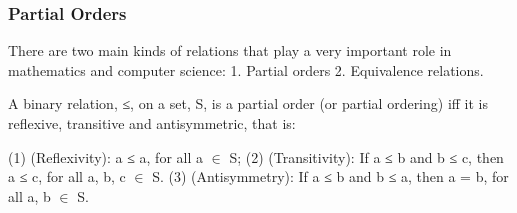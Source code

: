 
\begin{frame}
\frametitle{Partial Orders}
There are two main kinds of relations that play a very
important role in mathematics and computer science:
1. Partial orders
2. Equivalence relations.

\end{frame}
\begin{frame}
A binary relation, ≤, on a set, S, is
a partial order (or partial ordering) iﬀ it is reﬂexive,
transitive and antisymmetric, that is:

(1) (Reﬂexivity): a ≤ a, for all a $\in$ S;
(2) (Transitivity): If a ≤ b and b ≤ c, then a ≤ c, for
all a, b, c $\in$ S.
(3) (Antisymmetry): If a ≤ b and b ≤ a, then a = b, for
all a, b $\in$ S.

\end{frame}
